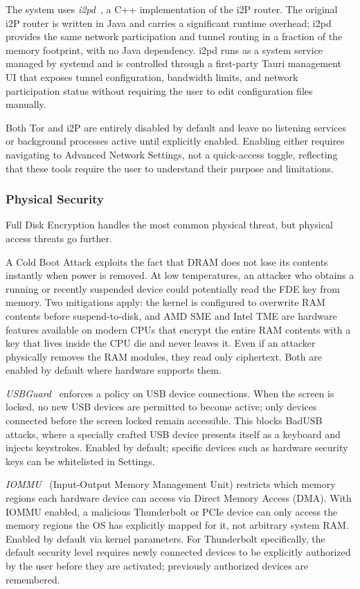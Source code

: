 The system uses \emph{i2pd}~\cite{i2pd}, a C++ implementation of the i2P
router. The original i2P router is written in Java and carries a significant
runtime overhead; i2pd provides the same network participation and tunnel
routing in a fraction of the memory footprint, with no Java dependency. i2pd
runs as a system service managed by systemd and is controlled through a
first-party Tauri management UI that exposes tunnel configuration, bandwidth
limits, and network participation status without requiring the user to edit
configuration files manually.

Both Tor and i2P are entirely disabled by default and leave no listening
services or background processes active until explicitly enabled. Enabling
either requires navigating to Advanced Network Settings, not a quick-access
toggle, reflecting that these tools require the user to understand their
purpose and limitations.

\subsubsection{Physical Security}
\label{sec:physical}

Full Disk Encryption handles the most common physical threat, but physical
access threats go further.

A Cold Boot Attack exploits the fact that DRAM does not lose its contents
instantly when power is removed. At low temperatures, an attacker who obtains
a running or recently suspended device could potentially read the FDE key from
memory. Two mitigations apply: the kernel is configured to overwrite RAM
contents before suspend-to-disk, and AMD SME and Intel TME are hardware
features available on modern CPUs that encrypt the entire RAM contents with a
key that lives inside the CPU die and never leaves it. Even if an attacker
physically removes the RAM modules, they read only ciphertext. Both are
enabled by default where hardware supports them.

\emph{USBGuard}~\cite{usbguard} enforces a policy on USB device connections. When the screen
is locked, no new USB devices are permitted to become active; only devices
connected before the screen locked remain accessible. This blocks BadUSB
attacks, where a specially crafted USB device presents itself as a keyboard
and injects keystrokes. Enabled by default; specific devices such as hardware
security keys can be whitelisted in Settings.

\emph{IOMMU}~\cite{archwiki:iommu} (Input-Output Memory Management Unit)
restricts which memory regions each hardware device can access via Direct
Memory Access (DMA). With IOMMU enabled, a malicious Thunderbolt or
PCIe device can only access the memory regions the OS has explicitly mapped
for it, not arbitrary system RAM. Enabled by default via kernel parameters.
For Thunderbolt specifically, the default security level requires newly
connected devices to be explicitly authorized by the user before they are
activated; previously authorized devices are remembered.

